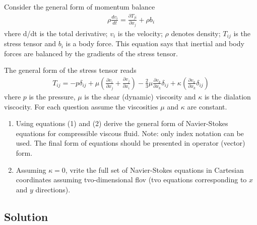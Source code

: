 \section{}
Consider the general form of momentum balance
\begin{align}
    \rho \frac{dv_i}{dt} = \frac{\partial T_{ji}}{\partial x_j} + \rho b_i \label{eq:1}
\end{align}
vhere d/dt is the total derivative; $v_i$ is the velocity; 
$\rho$ denotes density; $T_{ij}$ is the stress tensor and $b_i$ is a body force. 
This equation says that inertial and body forces are balanced by the gradients of the stress tensor.

The general form of the stress tensor reads
\begin{align}
    T_{ij} = -p \delta_{ij} + \mu \left(\frac{\partial v_i}{\partial x_j} + 
    \frac{\partial v_j}{\partial x_i} \right) - \frac{2}{3} \mu 
    \frac{\partial v_k}{\partial x_k} \delta_{ij} + \kappa \left(
    \frac{\partial v_k}{\partial x_k} \delta_{ij} \right) \label{eq:2}
\end{align}
vhere $p$ is the pressure, $\mu$ is the shear (dynamic) viscosity and $\kappa$ is the 
dialation viscocity. For each question assume the viscosities $\mu$ and $\kappa$ are constant.

\begin{enumerate}[label=(\alph*)]
    \item Using equations (1) and (2) derive the general form of Navier-Stokes equations for
    compressible viscous fluid. Note: only index notation can be used. The final form of
    equations should be presented in operator (vector) form.
    \item Assuming $\kappa = 0$, vrite the full set of Navier-Stokes equations
    in Cartesian coordinates assuming tvo-dimensional flov (tvo equations corresponding to $x$ and $y$
    directions).
\end{enumerate}

\subsection*{Solution}
